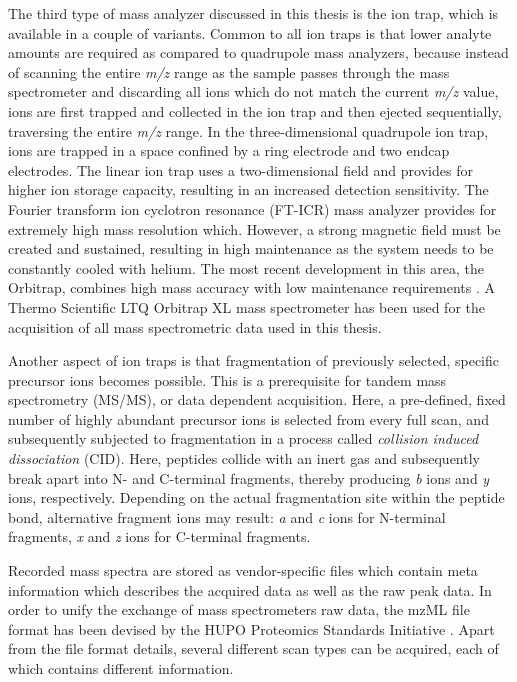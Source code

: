 The third type of mass analyzer discussed in this thesis is the ion trap,
which is available in a couple of variants.
Common to all ion traps is that lower analyte amounts are required as
compared to quadrupole mass analyzers, because instead of scanning
the entire {\em m/z} range as the sample passes through the mass spectrometer 
and discarding all ions which do not match the current {\em m/z} value, 
ions are first trapped and collected in the ion trap and then ejected 
sequentially, traversing the entire {\em m/z} range.
In the three-dimensional quadrupole ion trap, ions are trapped in a space
confined by a ring electrode and two endcap electrodes.
The linear ion trap uses a two-dimensional field and provides for higher ion
storage capacity, resulting in an increased detection sensitivity.
The Fourier transform ion cyclotron resonance (FT-ICR) mass analyzer provides
for extremely high mass resolution which.
However, a strong magnetic field must be created and sustained, resulting
in high maintenance as the system needs to be constantly cooled with helium. 
The most recent development in this area, the Orbitrap, combines high mass 
accuracy with low maintenance requirements \citep{Hu2005}. 
A Thermo Scientific LTQ Orbitrap XL mass spectrometer has been used for the
acquisition of all mass spectrometric data used in this thesis.

Another aspect of ion traps is that fragmentation of previously selected,
specific precursor ions becomes possible.
This is a prerequisite for tandem mass spectrometry (MS/MS), or data dependent
acquisition.
Here, a pre-defined, fixed number of highly abundant precursor ions is selected
from every full scan, and subsequently subjected to fragmentation
in a process called {\em collision induced dissociation} (CID).
Here, peptides collide with an inert gas and subsequently break apart into 
N- and C-terminal fragments, thereby producing {\em b} ions and {\em y} ions, 
respectively. 
Depending on the actual fragmentation site within the peptide bond,
alternative fragment ions may result: {\em a} and {\em c} ions for N-terminal
fragments, {\em x} and {\em z} ions for C-terminal fragments.


Recorded mass spectra are stored as vendor-specific files which contain meta 
information which describes the acquired data as well as the raw peak data.
In order to unify the exchange of mass spectrometers raw data, the mzML file 
format has been devised by the HUPO Proteomics Standards Initiative
\citep{Deutsch2008}.
Apart from the file format details, several different scan types can be
acquired, each of which contains different information.


